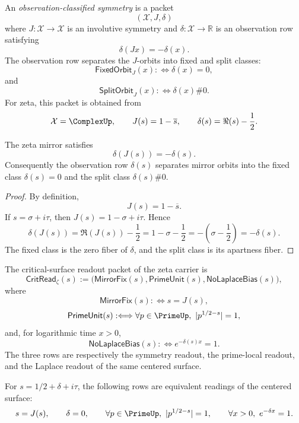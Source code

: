 \begin{definition}
\label{def:unified-reality-observation-classified-symmetry}
An \emph{observation-classified symmetry} is a packet
$$
(\mathcal X,J,\delta)
$$
where $J:\mathcal X\to\mathcal X$ is an involutive symmetry and
$\delta:\mathcal X\to\mathbb R$ is an observation row satisfying
$$
\delta(Jx)=-\delta(x).
$$
The observation row separates the $J$-orbits into fixed and split
classes:
$$
\mathsf{FixedOrbit}_{J}(x):\Longleftrightarrow \delta(x)=0,
$$
and
$$
\mathsf{SplitOrbit}_{J}(x):\Longleftrightarrow \delta(x)\#0.
$$
For zeta, this packet is obtained from
$$
\mathcal X=\ComplexUp,
\qquad
J(s)=1-\overline{s},
\qquad
\delta(s)=\Re(s)-\frac12.
$$
\end{definition}

\begin{theorem}
\label{thm:unified-reality-zeta-mirror-orbits-classified}
The zeta mirror satisfies
$$
\delta(J(s))=-\delta(s).
$$
Consequently the observation row $\delta(s)$ separates mirror orbits into
the fixed class $\delta(s)=0$ and the split class $\delta(s)\#0$.
\end{theorem}

\begin{proof}
By definition,
$$
J(s)=1-\overline{s}.
$$
If $s=\sigma+i\tau$, then $J(s)=1-\sigma+i\tau$.  Hence
$$
\delta(J(s))
=
\Re(J(s))-\frac12
=
1-\sigma-\frac12
=
-\left(\sigma-\frac12\right)
=-\delta(s).
$$
The fixed class is the zero fiber of $\delta$, and the split class is
its apartness fiber.
\end{proof}

\begin{definition}
\label{def:unified-reality-critical-surface-readout-packet}
The critical-surface readout packet of the zeta carrier is
$$
\mathsf{CritRead}_{\zeta}(s)
:=
\bigl(
\mathsf{MirrorFix}(s),
\mathsf{PrimeUnit}(s),
\mathsf{NoLaplaceBias}(s)
\bigr),
$$
where
$$
\mathsf{MirrorFix}(s):\Longleftrightarrow s=J(s),
$$
$$
\mathsf{PrimeUnit}(s):\Longleftrightarrow
\forall p\in\PrimeUp,\ |p^{1/2-s}|=1,
$$
and, for logarithmic time $x>0$,
$$
\mathsf{NoLaplaceBias}(s):\Longleftrightarrow
e^{-\delta(s)x}=1.
$$
The three rows are respectively the symmetry readout, the prime-local
readout, and the Laplace readout of the same centered surface.
\end{definition}

\begin{theorem}
\label{thm:unified-reality-prime-laplace-detect-same-fixed-surface}
For $s=1/2+\delta+i\tau$, the following rows are equivalent readings of
the centered surface:
$$
s=J(s),
\qquad
\delta=0,
\qquad
\forall p\in\PrimeUp,\ |p^{1/2-s}|=1,
\qquad
\forall x>0,\ e^{-\delta x}=1.
$$
\end{theorem}

